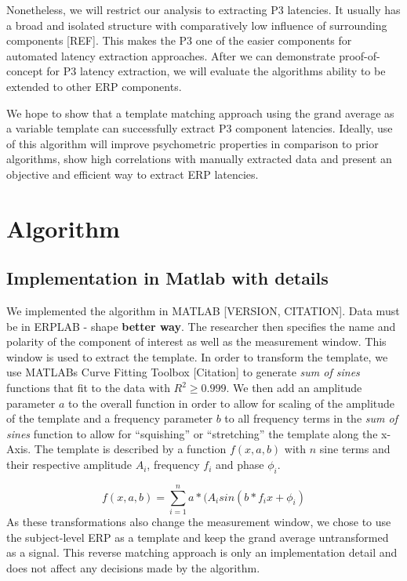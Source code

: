 \documentclass[
  man,floatsintext]{apa7}
\begin{document}
Nonetheless, we will restrict our analysis to extracting P3 latencies. It usually has a broad and isolated structure with comparatively low influence of surrounding components {[}REF{]}. This makes the P3 one of the easier components for automated latency extraction approaches. After we can demonstrate proof-of-concept for P3 latency extraction, we will evaluate the algorithms ability to be extended to other ERP components.

We hope to show that a template matching approach using the grand average as a variable template can successfully extract P3 component latencies. Ideally, use of this algorithm will improve psychometric properties in comparison to prior algorithms, show high correlations with manually extracted data and present an objective and efficient way to extract ERP latencies.

\hypertarget{algorithm}{%
\section{Algorithm}\label{algorithm}}

\hypertarget{implementation-in-matlab-with-details}{%
\subsection{Implementation in Matlab with details}\label{implementation-in-matlab-with-details}}

We implemented the algorithm in MATLAB {[}VERSION, CITATION{]}. Data must be in ERPLAB - shape \textbf{better way}. The researcher then specifies the name and polarity of the component of interest as well as the measurement window. This window is used to extract the template. In order to transform the template, we use MATLABs Curve Fitting Toolbox {[}Citation{]} to generate \emph{sum of sines} functions that fit to the data with \(R^2 \ge 0.999\). We then add an amplitude parameter \(a\) to the overall function in order to allow for scaling of the amplitude of the template and a frequency parameter \(b\) to all frequency terms in the \emph{sum of sines} function to allow for ``squishing'' or ``stretching'' the template along the x-Axis. The template is described by a function \(f(x, a, b)\) with \(n\) sine terms and their respective amplitude \(A_i\), frequency \(f_i\) and phase \(\phi_i\).

\[f(x, a,b ) = \sum_{i = 1}^{n} a*(A_isin(b*f_ix + \phi_i)\]
As these transformations also change the measurement window, we chose to use the subject-level ERP as a template and keep the grand average untransformed as a signal. This reverse matching approach is only an implementation detail and does not affect any decisions made by the algorithm.
\end{document}
